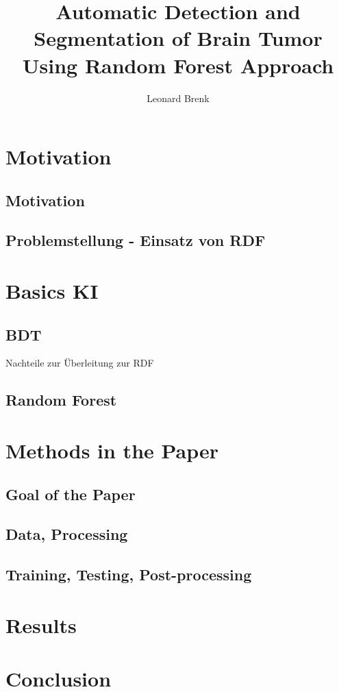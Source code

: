 \documentclass{article}
\title{Automatic Detection and Segmentation of Brain Tumor Using Random Forest Approach}
\author{Leonard Brenk}
\begin{document}
\maketitle
\newpage
\tableofcontents

\newpage

    \section{Motivation}
        \subsection{Motivation}
        \subsection{Problemstellung - Einsatz von RDF}
    \section{Basics KI}
        \subsection{BDT}
        Nachteile zur Überleitung zur RDF
        \subsection{Random Forest}
    \section{Methods in the Paper}
        \subsection{Goal of the Paper}
        \subsection{Data, Processing}
        \subsection{Training, Testing, Post-processing}
    \section{Results}
    \section{Conclusion}
\end{document}
